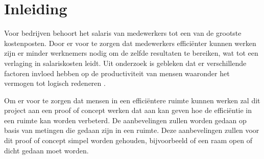 \section{Inleiding} \label{sec:introduction}
Voor bedrijven behoort het salaris van medewerkers tot een van de grootste kostenposten. Door er voor te zorgen dat medewerkers efficiënter kunnen werken zijn er minder werknemers nodig om de zelfde resultaten te bereiken, wat tot een verlaging in salariskosten leidt. Uit onderzoek is gebleken dat er verschillende factoren invloed hebben op de productiviteit van mensen waaronder het vermogen tot logisch redeneren \cite{wyon2006room}.

Om er voor te zorgen dat mensen in een efficiëntere ruimte kunnen werken zal dit project aan een proof of concept werken dat aan kan geven hoe de efficiëntie in een ruimte kan worden verbeterd. De aanbevelingen zullen worden gedaan op basis van metingen die gedaan zijn in een ruimte. Deze aanbevelingen zullen voor dit proof of concept simpel worden gehouden, bijvoorbeeld of een raam open of dicht gedaan moet worden.
